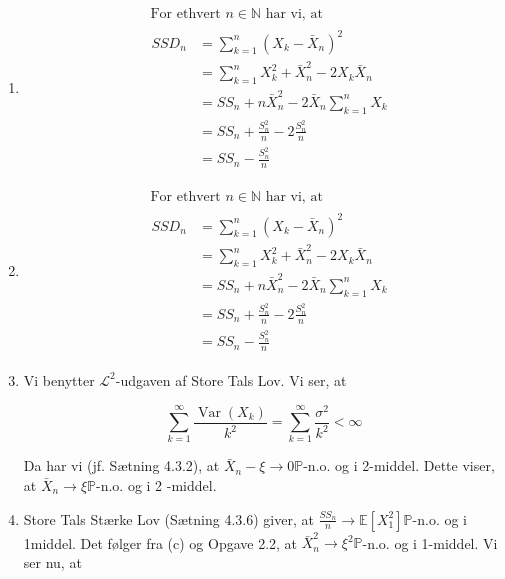 \documentclass{Class}
\begin{document}
\begin{enumerate}
    \item $$\begin{aligned}
        &\text { For ethvert } n \in \mathbb{N} \text { har vi, at }\\
        &\begin{aligned}
        S S D_n & =\sum_{k=1}^n\left(X_k-\bar{X}_n\right)^2 \\
        & =\sum_{k=1}^n X_k^2+\bar{X}_n^2-2 X_k \bar{X}_n \\
        & =S S_n+n \bar{X}_n^2-2 \bar{X}_n \sum_{k=1}^n X_k \\
        & =S S_n+\frac{S_n^2}{n}-2 \frac{S_n^2}{n} \\
        & =S S_n-\frac{S_n^2}{n}
        \end{aligned}
        \end{aligned}$$
    \item $$\begin{aligned}
        &\text { For ethvert } n \in \mathbb{N} \text { har vi, at }\\
        &\begin{aligned}
        S S D_n & =\sum_{k=1}^n\left(X_k-\bar{X}_n\right)^2 \\
        & =\sum_{k=1}^n X_k^2+\bar{X}_n^2-2 X_k \bar{X}_n \\
        & =S S_n+n \bar{X}_n^2-2 \bar{X}_n \sum_{k=1}^n X_k \\
        & =S S_n+\frac{S_n^2}{n}-2 \frac{S_n^2}{n} \\
        & =S S_n-\frac{S_n^2}{n}
        \end{aligned}
        \end{aligned}$$
    \item Vi benytter $\mathcal{L}^2$-udgaven af Store Tals Lov. Vi ser, at

    $$
    \sum_{k=1}^{\infty} \frac{\operatorname{Var}\left(X_k\right)}{k^2}=\sum_{k=1}^{\infty} \frac{\sigma^2}{k^2}<\infty
    $$
    
    
    Da har vi (jf. Sætning 4.3.2), at $\bar{X}_n-\xi \rightarrow 0 \mathbb{P}$-n.o. og i 2-middel. Dette viser, at $\bar{X}_n \rightarrow \xi \mathbb{P}$-n.o. og i 2 -middel.
    \item Store Tals Stærke Lov (Sætning 4.3.6) giver, at $\frac{S S_n}{n} \rightarrow \mathbb{E}\left[X_1^2\right] \mathbb{P}$-n.o. og i 1middel. Det følger fra (c) og Opgave 2.2, at $\bar{X}_n^2 \rightarrow \xi^2 \mathbb{P}$-n.o. og i 1-middel. Vi ser nu, at


\end{enumerate}
\end{document}
